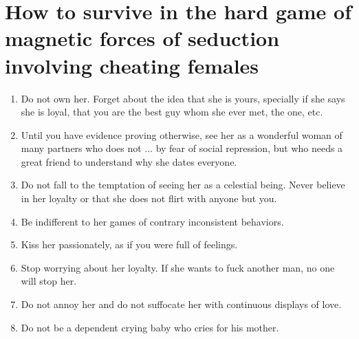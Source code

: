 \section{How to survive in the hard game of magnetic forces of seduction involving cheating females}

\begin{enumerate}
	\item Do not own her. Forget about the idea that she is yours, specially if she says she is loyal, that you are the best guy whom she ever met, the one, etc.
	\item Until you have evidence proving otherwise, see her as a wonderful woman of many partners who does not ... by fear of social repression, but who needs a great friend to understand why she dates everyone.
	\item Do not fall to the temptation of seeing her as a celestial being. Never believe in her loyalty or that she does not flirt with anyone but you.
	\item Be indifferent to her games of contrary inconsistent behaviors.
	\item Kiss her passionately, as if you were full of feelings.
	\item Stop worrying about her loyalty. If she wants to fuck another man, no one will stop her.
	\item Do not annoy her and do not suffocate her with continuous displays of love.
	\item Do not be a dependent crying baby who cries for his mother.
\end{enumerate}